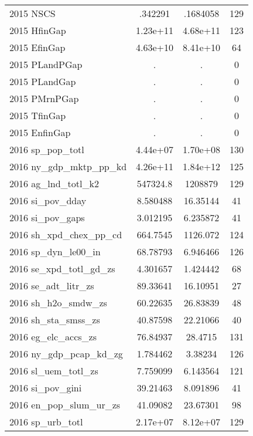 {\begin{tabular}{l*{1}{ccc}}
2015 NSCS           &     .342291&    .1684058&         129\\
2015 HfinGap        &    1.23e+11&    4.68e+11&         123\\
2015 EfinGap        &    4.63e+10&    8.41e+10&          64\\
2015 PLandPGap      &           .&           .&           0\\
2015 PLandGap       &           .&           .&           0\\
2015 PMrnPGap       &           .&           .&           0\\
2015 TfinGap        &           .&           .&           0\\
2015 EnfinGap       &           .&           .&           0\\
2016 sp\_pop\_totl    &    4.44e+07&    1.70e+08&         130\\
2016 ny\_gdp\_mktp\_pp\_kd&    4.26e+11&    1.84e+12&         125\\
2016 ag\_lnd\_totl\_k2 &    547324.8&     1208879&         129\\
2016 si\_pov\_dday    &    8.580488&    16.35144&          41\\
2016 si\_pov\_gaps    &    3.012195&    6.235872&          41\\
2016 sh\_xpd\_chex\_pp\_cd&    664.7545&    1126.072&         124\\
2016 sp\_dyn\_le00\_in &    68.78793&    6.946466&         126\\
2016 se\_xpd\_totl\_gd\_zs&    4.301657&    1.424442&          68\\
2016 se\_adt\_litr\_zs &    89.33641&    16.10951&          27\\
2016 sh\_h2o\_smdw\_zs &    60.22635&    26.83839&          48\\
2016 sh\_sta\_smss\_zs &    40.87598&    22.21066&          40\\
2016 eg\_elc\_accs\_zs &    76.84937&     28.4715&         131\\
2016 ny\_gdp\_pcap\_kd\_zg&    1.784462&     3.38234&         126\\
2016 sl\_uem\_totl\_zs &    7.759099&    6.143564&         121\\
2016 si\_pov\_gini    &    39.21463&    8.091896&          41\\
2016 en\_pop\_slum\_ur\_zs&    41.09082&    23.67301&          98\\
2016 sp\_urb\_totl    &    2.17e+07&    8.12e+07&         129\\

\end{tabular}}
